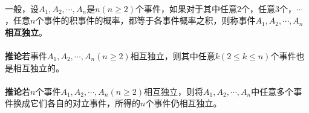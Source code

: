 \paragraph{}
一般，设$A_1,A_2,\cdots,A_n$是$n(n \geq 2)$个事件，如果对于其中任意$2$个，任意$3$个，$\cdots$，任意$n$个事件的积事件的概率，都等于各事件概率之积，则称事件$A_1,A_2,\cdots,A_n$\textbf{相互独立}。

\paragraph{}
\textbf{推论\;}若事件$A_1,A_2,\cdots,A_n(n \geq 2)$相互独立，则其中任意$k(2 \leq k \leq n)$个事件也是相互独立的。

\paragraph{}
\textbf{推论\;}若$n$个事件$A_1,A_2,\cdots,A_n(n \geq 2)$相互独立，则将$A_1,A_2,\cdots,A_n$中任意多个事件换成它们各自的对立事件，所得的$n$个事件仍相互独立。
